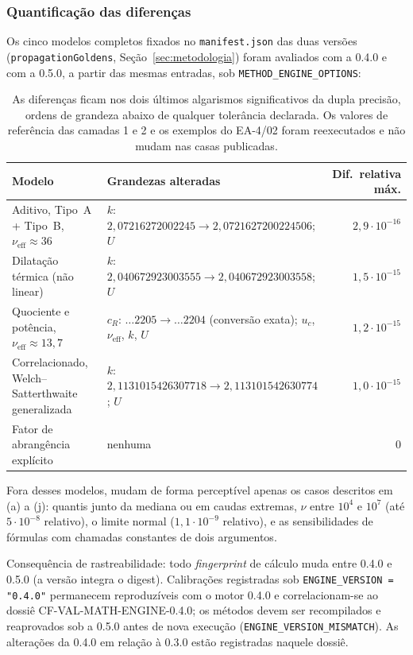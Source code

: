 \documentclass[11pt,a4paper]{article}
\newcommand{\docVersion}{0.5.0}
\newcommand{\previousVersion}{0.4.0}
\newcommand{\auditedVersion}{0.3.0}
\begin{document}
\subsubsection*{Quantificação das diferenças}

Os cinco modelos completos fixados no \texttt{manifest.json} das duas versões (\texttt{propagationGoldens}, Seção~\ref{sec:metodologia}) foram avaliados com a \previousVersion{} e com a \docVersion{}, a partir das mesmas entradas, sob \texttt{METHOD\_ENGINE\_OPTIONS}:

\begin{table}[H]
  \centering
  \small
  \begin{tabularx}{\textwidth}{l X r}
    \toprule
    \textbf{Modelo} & \textbf{Grandezas alteradas} & \textbf{Dif.\ relativa máx.} \\
    \midrule
    Aditivo, Tipo~A + Tipo~B, \(\nu_\text{eff} \approx 36\) & \(k\): \(2{,}07216272002245 \to 2{,}0721627200224506\); \(U\) & \(2{,}9 \cdot 10^{-16}\) \\
    Dilatação térmica (não linear) & \(k\): \(2{,}040672923003555 \to 2{,}040672923003558\); \(U\) & \(1{,}5 \cdot 10^{-15}\) \\
    Quociente e potência, \(\nu_\text{eff} \approx 13{,}7\) & \(c_R\): \(\ldots 2205 \to \ldots 2204\) (conversão exata); \(u_c\), \(\nu_\text{eff}\), \(k\), \(U\) & \(1{,}2 \cdot 10^{-15}\) \\
    Correlacionado, Welch--Satterthwaite generalizada & \(k\): \(2{,}1131015426307718 \to 2{,}113101542630774\); \(U\) & \(1{,}0 \cdot 10^{-15}\) \\
    Fator de abrangência explícito & nenhuma & 0 \\
    \bottomrule
  \end{tabularx}
  \caption*{\small As diferenças ficam nos dois últimos algarismos significativos da dupla precisão, ordens de grandeza abaixo de qualquer tolerância declarada. Os valores de referência das camadas 1 e 2 e os exemplos do EA-4/02 foram reexecutados e não mudam nas casas publicadas.}
\end{table}

Fora desses modelos, mudam de forma perceptível apenas os casos descritos em (a) a (j): quantis junto da mediana ou em caudas extremas, \(\nu\) entre \(10^4\) e \(10^7\) (até \(5 \cdot 10^{-8}\) relativo), o limite normal (\(1{,}1 \cdot 10^{-9}\) relativo), e as sensibilidades de fórmulas com chamadas constantes de dois argumentos.

Consequência de rastreabilidade: todo \emph{fingerprint} de cálculo muda entre \previousVersion{} e \docVersion{} (a versão integra o digest). Calibrações registradas sob \texttt{ENGINE\_VERSION = "\previousVersion"} permanecem reproduzíveis com o motor \previousVersion{} e correlacionam-se ao dossiê CF-VAL-MATH-ENGINE-0.4.0; os métodos devem ser recompilados e reaprovados sob a \docVersion{} antes de nova execução (\texttt{ENGINE\_VERSION\_MISMATCH}). As alterações da \previousVersion{} em relação à \auditedVersion{} estão registradas naquele dossiê.
\end{document}
